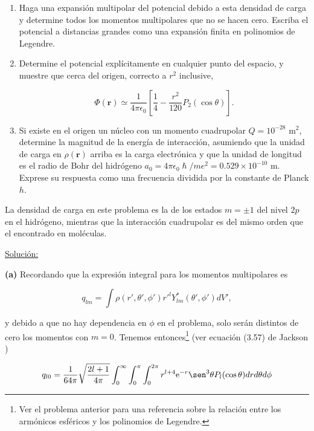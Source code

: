 \documentclass[a4paper,11pt]{article}
\numberwithin{equation}{section}
\newcommand{\euler}{\mathrm{e}}
\begin{document}
\begin{enumerate}[label=\textbf{(\alph*)}]
\item Haga una expansión multipolar del potencial debido a esta densidad de 
carga y determine todos los momentos multipolares que no se hacen cero. Escriba 
el potencial a distancias grandes como una expansión finita en polinomios de 
Legendre. 
\item Determine el potencial explícitamente en cualquier punto del espacio, y 
muestre que cerca del origen, correcto a $r^2$ inclusive,

$$
\Phi(\mathbf{r}) \simeq \frac{1}{4\pi\epsilon_0}\left[\frac{1}{4} 
 - \frac{r^2}{120}P_2(\cos{\theta})\right].
$$

\item Si existe en el origen un núcleo con un momento cuadrupolar $Q = 10^{-28}$ m$^2$, 
determine la magnitud de la energía de interacción, asumiendo que la unidad de 
carga en $\rho(\mathbf{r})$ arriba es la carga electrónica y que la unidad de 
longitud es el radio de Bohr del hidrógeno $a_0 = 4\pi\epsilon_0\hslash/me^2 = 
0.529 \times 10^{-10}$ m. Exprese su respuesta como una frecuencia dividida por 
la constante de Planck $h$.
\end{enumerate}

La densidad de carga en este problema es la de los estados $m = \pm 1$ del nivel 
$2p$ en el hidrógeno, mientras que la interacción cuadrupolar es del mismo orden 
que el encontrado en moléculas.

\vspace{.3cm}

\underline{Solución:} \vspace{.3cm}

\textbf{(a)} Recordando que la expresión integral para los momentos multipolares es 

\begin{equation}
 q_{lm} = \int \rho(r',\theta',\phi')r'^l Y^*_{lm}(\theta',\phi')dV',
\end{equation}

y debido a que no hay dependencia en $\phi$ en el problema, solo serán distintos de 
cero los momentos con $m=0$. Tenemos entonces\footnote{Ver el problema anterior 
para una referencia sobre la relación entre los armónicos esféricos y los polinomios 
de Legendre.} (ver ecuación (3.57) de Jackson \cite{jackson})

\begin{equation}
 q_{l0} = \frac{1}{64\pi}\sqrt{\frac{2l+1}{4\pi}}\int_0^\infty \int_0^\pi \int_0^{2\pi} 
 r^{l+4}\euler^{-r}\sen^3{\theta}P_l(\cos{\theta})drd\theta d\phi
\end{equation}
\end{document}
